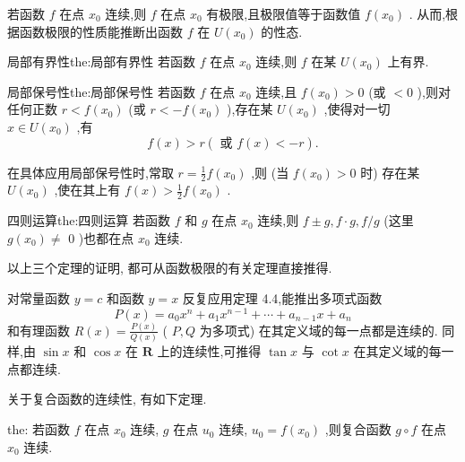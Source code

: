 若函数 \(f\) 在点 \({x}_{0}\) 连续,则 \(f\) 在点 \({x}_{0}\) 有极限,且极限值等于函数值 \(f\left( {x}_{0}\right)\) . 从而,根据函数极限的性质能推断出函数 \(f\) 在 \(U\left( {x}_{0}\right)\) 的性态.

\begin{theorem}{局部有界性}{the:局部有界性}
若函数 \(f\) 在点 \({x}_{0}\) 连续,则 \(f\) 在某 \(U\left( {x}_{0}\right)\) 上有界.
\end{theorem}


\begin{theorem}{局部保号性}{the:局部保号性}
若函数 \(f\) 在点 \({x}_{0}\) 连续,且 \(f\left( {x}_{0}\right)  > 0\) (或 \(< 0\) ),则对任何正数 \(r < f\left( {x}_{0}\right)\) (或 \(r <  - f\left( {x}_{0}\right)\) ),存在某 \(U\left( {x}_{0}\right)\) ,使得对一切 \(x \in  U\left( {x}_{0}\right)\) ,有
\[
f\left( x\right)  > r\left( {\text{ 或 }f\left( x\right)  <  - r}\right) .
\]
\end{theorem}

\begin{remark}
在具体应用局部保号性时,常取 \(r = \frac{1}{2}f\left( {x}_{0}\right)\) ,则 (当 \(f\left( {x}_{0}\right)  > 0\) 时) 存在某 \(U\left( {x}_{0}\right)\) ,使在其上有 \(f\left( x\right)  > \frac{1}{2}f\left( {x}_{0}\right)\) .
\end{remark}


\begin{theorem}{四则运算}{the:四则运算}
若函数 \(f\) 和 \(g\) 在点 \({x}_{0}\) 连续,则 \(f \pm  g,f \cdot  g,f/g\) (这里 \(g\left( {x}_{0}\right)  \neq\) 0 )也都在点 \({x}_{0}\) 连续.
\end{theorem}


以上三个定理的证明, 都可从函数极限的有关定理直接推得.

对常量函数 \(y = c\) 和函数 \(y = x\) 反复应用定理 4.4,能推出多项式函数
\[
P\left( x\right)  = {a}_{0}{x}^{n} + {a}_{1}{x}^{n - 1} + \cdots  + {a}_{n - 1}x + {a}_{n}
\]
和有理函数 \(R\left( x\right)  = \frac{P\left( x\right) }{Q\left( x\right) }\) ( \(P,Q\) 为多项式) 在其定义域的每一点都是连续的. 同样,由 \(\sin x\) 和 \(\cos x\) 在 \(\mathbf{R}\) 上的连续性,可推得 \(\tan x\) 与 \(\cot x\) 在其定义域的每一点都连续.

关于复合函数的连续性, 有如下定理.

\begin{theorem}{}{the:}
若函数 \(f\) 在点 \({x}_{0}\) 连续, \(g\) 在点 \({u}_{0}\) 连续, \({u}_{0} = f\left( {x}_{0}\right)\) ,则复合函数 \(g \circ  f\) 在点 \({x}_{0}\) 连续.
\end{theorem}


